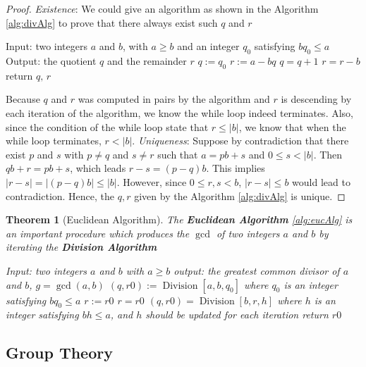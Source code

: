 \documentclass[paper=a4, fontsize=11pt]{scrartcl}
\newtheorem{theorem}{Theorem}[section]
\numberwithin{equation}{section}		%
\numberwithin{figure}{section}			%
\numberwithin{table}{section}				%
\newcommand{\Division}{\ensuremath{\operatorname{Division}}}
\theoremstyle{definition}
\theoremstyle{remark}
\theoremstyle{example}
\begin{document}
\begin{proof}
    \textit{Existence}: We could give an algorithm as shown in the Algorithm \ref{alg:divAlg} to prove that there always exist such $q$ and $r$
    \begin{algorithm}[H]
        \caption{Division$[a,b,q_0]$}\label{alg:divAlg}
        \begin{algorithmic}
            \State Input: two integers $a$ and $b$, with $a \geq b$ and an integer $q_0$ satisfying $bq_0 \leq a$
            \State Output: the quotient $q$ and the remainder $r$
            \newline
            \State $q := q_0$
            \State $r := a - bq$
                \State $q = q+1$
                \State $r = r-b$
            \EndWhile
            \State return $q,\, r$
        \end{algorithmic}
    \end{algorithm}
    Because $q$ and $r$ was computed in pairs by the algorithm and $r$ is descending by each iteration of the algorithm, we know the while loop indeed terminates. Also, since the condition of the while loop state that $r \leq \lvert b \rvert$, we know that when the while loop terminates, $r < \lvert b \rvert$.
    \newline
    \textit{Uniqueness}: Suppose by contradiction that there exist $p$ and $s$ with $p \neq q$ and $s \neq r$ such that $a = pb + s$ and $0 \leq s < \lvert b \rvert$. Then $qb + r = pb + s$, which leads $r - s = (p-q)b$. This implies $\lvert r - s \rvert = \lvert (p - q)b \rvert \leq \lvert b \rvert$. However, since $0 \leq r,s < b$, $\lvert r - s \rvert \leq b$ would lead to contradiction. Hence, the $q,r$ given by the Algorithm \ref{alg:divAlg} is unique.
\end{proof}

\begin{theorem}[Euclidean Algorithm]
    The \textbf{Euclidean Algorithm} \ref{alg:eucAlg} is an important procedure which produces the $\gcd$ of two integers $a$ and $b$ by iterating the \textbf{Division Algorithm}
    \begin{algorithm}[H]
        \caption{Euclidean$[a,b]$}\label{alg:eucAlg}
        \begin{algorithmic}
            \State Input: two integers $a$ and $b$ with $a \geq b$
            \State output: the greatest common divisor of $a$ and $b$, $g = \gcd(a,b)$
            \newline
            \State $(q,r0) := \Division[a,b,q_0]$ where $q_0$ is an integer satisfying $bq_0 \leq a$
            \State $r := r0$
                \State $r = r0$
                \State $(q,r0) = \Division[b,r,h]$ where $h$ is an integer satisfying $bh \leq a$, and $h$ should be updated for each iteration
            \EndWhile
            \State return $r0$
        \end{algorithmic}
    \end{algorithm}
\end{theorem}

\newpage
\subsection{Group Theory}




\newpage
\printbibliography
\end{document}
